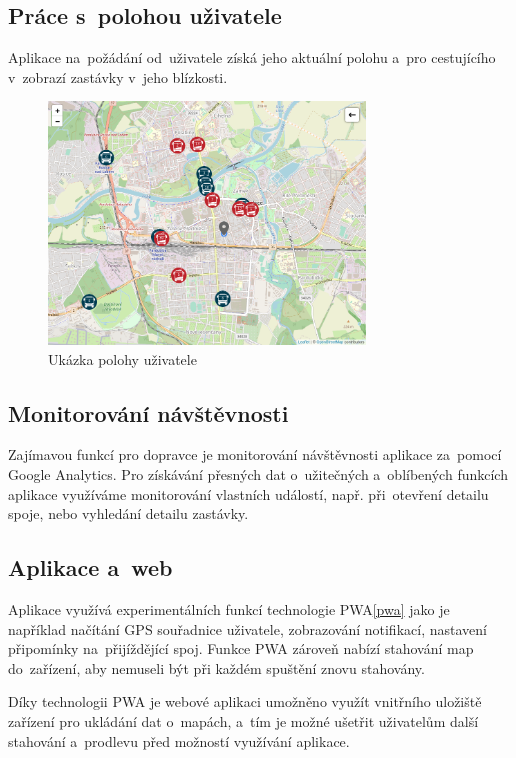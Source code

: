 \subsection{Práce s~polohou uživatele}
Aplikace na~požádání od~uživatele získá jeho aktuální polohu a~pro cestujícího v~zobrazí zastávky v~jeho blízkosti.

\begin{figure}[H]
    \centering
    \includegraphics[width=0.75\textwidth]{images/position.png}
    \caption{Ukázka polohy uživatele}
    \label{poloha}
\end{figure}
\subsection{Monitorování návštěvnosti}
Zajímavou funkcí pro dopravce je monitorování návštěvnosti aplikace za~pomocí Google Analytics. Pro získávání přesných dat o~užitečných a~oblíbených funkcích aplikace využíváme monitorování vlastních událostí, např. při~otevření detailu spoje, nebo vyhledání detailu zastávky.
\subsection{Aplikace a~web}
Aplikace využívá experimentálních funkcí technologie PWA\ref{pwa} jako je například načítání GPS souřadnice uživatele, zobrazování notifikací, nastavení připomínky na~přijíždějící spoj. Funkce PWA zároveň nabízí stahování map do~zařízení, aby nemuseli být při každém spuštění znovu stahovány.

Díky technologii PWA je webové aplikaci umožněno využít vnitřního uložiště zařízení pro ukládání dat o~mapách, a~tím je možné ušetřit uživatelům další stahování a~prodlevu před možností využívání aplikace.

